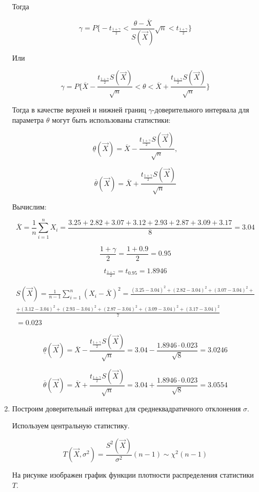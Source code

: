 \documentclass[a4paper,14pt]{extreport} %
\begin{document}
\begin{enumerate}
Тогда

$$\gamma=P\bigg\{-t_{\frac{1+\gamma}{2}}<\frac{\theta-\overline X}{S(\vec X)}\sqrt{n}<t_{\frac{1+\gamma}{2}}\bigg\}$$

Или

$$\gamma=P\bigg\{\overline X-\frac{t_{\frac{1+\gamma}{2}}S(\vec X)}{\sqrt{n}}<\theta<\overline X+\frac{t_{\frac{1+\gamma}{2}}S(\vec X)}{\sqrt{n}}\bigg\}$$

Тогда в качестве верхней и нижней границ $\gamma$-доверительного интервала для параметра $\theta$ могут быть использованы статистики:

$$\underline\theta(\vec X)=\overline X-\frac{t_{\frac{1+\gamma}{2}}S(\vec X)}{\sqrt{n}},$$

$$\overline\theta(\vec X)=\overline X+\frac{t_{\frac{1+\gamma}{2}}S(\vec X)}{\sqrt{n}}$$

Вычислим:

$$\overline X=\frac{1}{n}\sum_{i=1}^nX_i=\frac{3.25+2.82+3.07+3.12+2.93+2.87+3.09+3.17}{8}=3.04$$

$$\frac{1+\gamma}{2}=\frac{1+0.9}{2}=0.95$$

$$t_{\frac{1+\gamma}{2}}=t_{0.95}=1.8946$$

\begin{multline*}
S(\vec X)=\frac{1}{n-1}\sum_{i=1}^n(X_i-\overline X)^2=\frac{(3.25-3.04)^2 +(2.82-3.04)^2 +(3.07-3.04)^2+}{}\\ \frac{+(3.12-3.04)^2 +(2.93-3.04)^2 +(2.87-3.04)^2 +(3.09-3.04)^2 +(3.17-3.04)^2 }{7}\\
=0.023
\end{multline*}

$$\underline\theta(\vec X)=\overline X-\frac{t_{\frac{1+\gamma}{2}}S(\vec X)}{\sqrt{n}}=3.04-\frac{1.8946\cdot 0.023}{\sqrt{8}}=3.0246$$

$$\overline\theta(\vec X)=\overline X+\frac{t_{\frac{1+\gamma}{2}}S(\vec X)}{\sqrt{n}}=3.04+\frac{1.8946\cdot 0.023}{\sqrt{8}}=3.0554$$

\item Построим доверительный интервал для среднеквадратичного отклонения $\sigma$. 

Используем центральную статистику. 

$$T(\vec X, \sigma^2)=\frac{S^2(\vec X)}{\sigma^2}(n-1) \sim \chi^2(n-1)$$

На рисунке изображен график функции плотности распределения статистики $T$. 


\end{enumerate}
\end{document}
